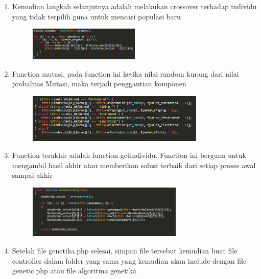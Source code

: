 \begin{enumerate}
	\item Kemudian langkah selanjutnya adalah melakukan crossover terhadap individu yang tidak terpilih guna untuk mencari populasi baru
		\begin{figure}[!htbp]
    		\centering
    		\includegraphics[width=0.5\textwidth]{figures/GA5.PNG}
    		\label{GA5}
		\end{figure}
		
	\item Function mutasi, pada function ini ketika nilai random kurang dari nilai probalitas Mutasi, maka terjadi penggantian komponen
		\begin{figure}[!htbp]
    		\centering
    		\includegraphics[width=0.8\textwidth]{figures/GA6.PNG}
    		\label{GA6}
		\end{figure}
		
	\item Function terakhir adalah function getindividu. Function ini berguna untuk mengambil hasil akhir atau memberikan solusi terbaik dari setiap proses awal sampai akhir
		\begin{figure}[!htbp]
    		\centering
    		\includegraphics[width=0.7\textwidth]{figures/GA7.PNG}
    		\label{GA7}
		\end{figure}
		
	\item Setelah file genetika.php selesai, simpan file tersebut kemudian buat file controller dalam folder yang sama yang kemudian akan include dengan file genetic.php atau file algoritma genetika


\end{enumerate}

